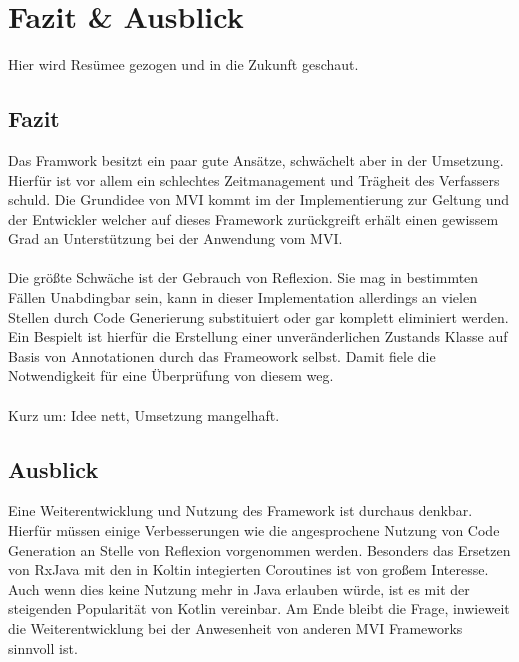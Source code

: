 \section{Fazit \& Ausblick}
Hier wird Resümee gezogen und in die Zukunft geschaut.

\subsection{Fazit}
Das Framwork besitzt ein paar gute Ansätze, schwächelt aber in der Umsetzung. Hierfür ist vor allem ein schlechtes Zeitmanagement und Trägheit des Verfassers schuld. Die Grundidee von MVI kommt im der Implementierung zur Geltung und der Entwickler welcher auf dieses Framework zurückgreift erhält einen gewissem Grad an Unterstützung bei der Anwendung vom MVI.
\\\\
Die größte Schwäche ist der Gebrauch von Reflexion. Sie mag in bestimmten Fällen Unabdingbar sein, kann in dieser Implementation allerdings an vielen Stellen durch Code Generierung substituiert oder gar komplett eliminiert werden. Ein Bespielt ist hierfür die Erstellung einer unveränderlichen Zustands Klasse auf Basis von Annotationen durch das Frameowork selbst. Damit fiele die Notwendigkeit für eine Überprüfung von diesem weg.
\\\\  
Kurz um: Idee nett, Umsetzung mangelhaft.

\subsection{Ausblick}
Eine Weiterentwicklung und Nutzung des Framework ist durchaus denkbar. Hierfür müssen einige Verbesserungen wie die angesprochene Nutzung von Code Generation an Stelle von Reflexion vorgenommen werden. Besonders das Ersetzen von RxJava mit den in Koltin integierten Coroutines ist von großem Interesse. Auch wenn dies keine Nutzung mehr in Java erlauben würde, ist es mit der steigenden Popularität von Kotlin vereinbar. Am Ende bleibt die Frage, inwieweit die Weiterentwicklung bei der Anwesenheit von anderen MVI Frameworks sinnvoll ist. 